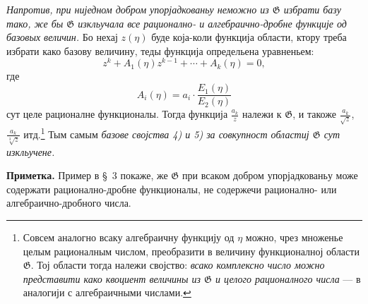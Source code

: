 \documentclass[11pt]{article}
\begin{document}
{\itshape Напротив, при ниједном добром упорјадкованьу неможно из $\mathfrak G$ избрати базу тако, же бы $\mathfrak G$ изкльучала все рационално- и алгебраично-дробне функције од базовых величин.} Бо нехај $z(\eta)$ буде која-коли функција области, ктору треба избрати како базову величину, теды функција определьена уравненьем:
\[
 z^k+A_1(\eta)z^{k-1}+\cdots+A_k(\eta)=0,
\]
где
\[
 A_i(\eta)=a_i\cdot\frac{E_1(\eta)}{E_2(\eta)}
\]
сут целе рационалне функционалы. Тогда функција $\frac{a_k}{z}$ належи к $\mathfrak G$, и такоже $\frac{a_k}{\sqrt z}$, $\frac{a_k}{\sqrt[3]z}$ итд.\footnote{Совсем аналогно всаку алгебраичну функцију од $\eta$ можно, чрез множенье целым рационалным числом, преобразити в величину функционалној области $\mathfrak G$. Тој области тогда належи својство: {\itshape всако комплексно число можно представити како квоциент величины из $\mathfrak G$ и целого рационалного числа} --- в аналогији с алгебраичными числами.} Тым самым {\itshape базове својства 4) и 5) за совкупност областиј $\mathfrak G$ сут изкльучене.}

\textbf{Приметка.} Пример в \S\ 3 покаже, же $\mathfrak G$ при всаком добром упорјадкованьу може содержати рационално-дробне функционалы, не содержечи рационално- или алгебраично-дробного числа.
\end{document}

